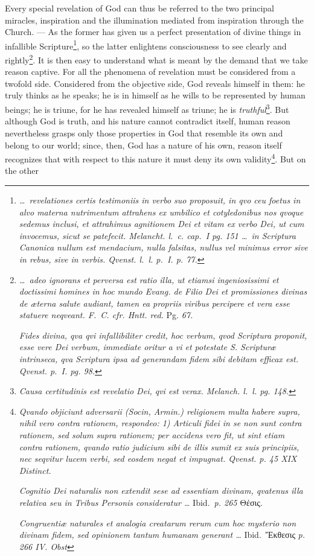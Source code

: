 \documentclass[12pt]{book}
\newcommand{\opage}[1]{\marginnote{\footnotesize\textit{[#1]}}}
\begin{document}
Every special revelation of God can thus be referred to the two principal
miracles, inspiration and the illumination mediated from inspiration through
the Church. --- As the former has given us a perfect presentation of divine
things in infallible Scripture\footnote{\textit{\ldots\ revelationes certis
testimoniis in verbo suo proposuit, in qvo ceu foetus in alvo materna
nutrimentum attrahens ex umbilico et cotyledonibus nos qvoque sedemus
inclusi, et attrahimus agnitionem Dei et vitam ex verbo Dei, ut cum
invocemus, sicut se patefecit. Melancht. l.~c. cap.~I pg. 151 \ldots\ in
Scriptura Canonica nullum est mendacium, nulla falsitas, nullus vel minimus
error sive in rebus, sive in verbis. Qvenst. l.~l. p.~I. p. 77.}}, so the
latter enlightens consciousness
\opage{77} \setcounter{footnote}{0}%
to see clearly and rightly\footnote{\textit{\ldots\ adeo ignorans et perversa
est ratio illa, ut etiamsi ingeniosissimi et doctissimi homines in hoc mundo
Evang. de Filio Dei et promissiones divinas de æterna salute audiant, tamen
ea propriis viribus percipere et vera esse statuere neqveant. F.~C. cfr.
Hntt. red.} Pg. \textit{67.}

\textit{Fides divina, qva qvi infallibiliter credit, hoc verbum, qvod
Scriptura proponit, esse vere Dei verbum, immediate oritur a vi et potestate
S. Scripturæ intrinseca, qva Scriptura ipsa ad generandam fidem sibi debitam
efficax est. Qvenst. p.~I. pg. 98.}}. It is then easy to understand what is
meant by the demand that we take reason captive. For all the phenomena of
revelation must be considered from a twofold side. Considered from the
objective side, God reveals himself in them: he truly thinks as he speaks; he
is in himself as he wills to be represented by human beings; he is triune,
for he has revealed himself as triune; he is
\emph{truthful}\footnote{\textit{Causa certitudinis est revelatio Dei, qvi est
verax. Melanch. l.~l. pg. 148.}}. But although God is truth, and his nature
cannot contradict itself, human reason nevertheless grasps only those
properties in God that resemble its own and belong to our world; since,
then, God has a nature of his own, reason itself recognizes that with respect
to this nature it must deny its own validity\footnote{\textit{Qvando
objiciunt adversarii (Socin, Armin.) religionem multa habere supra, nihil
vero contra rationem, respondeo: 1) Articuli fidei in se non sunt contra
rationem, sed solum supra rationem; per \emph{accidens} vero fit, ut sint
etiam contra rationem, qvando ratio judicium sibi de illis sumit ex suis
principiis, nec seqvitur lucem verbi, sed eosdem negat et impugnat. Qvenst.
p. 45 XIX Distinct.}

\textit{Cognitio Dei naturalis non extendit sese ad essentiam divinam,
qvatenus illa relativa seu in Tribus Personis consideratur \ldots} Ibid.\
\textit{p. 265} Θέσις.

\textit{Congruentiæ naturales et analogia creatarum rerum cum hoc mysterio
non divinam fidem, sed opinionem tantum humanam generant \ldots} Ibid.\
Ἔκθεσις \textit{p. 266 IV. Obst}}. But on the other
\end{document}
